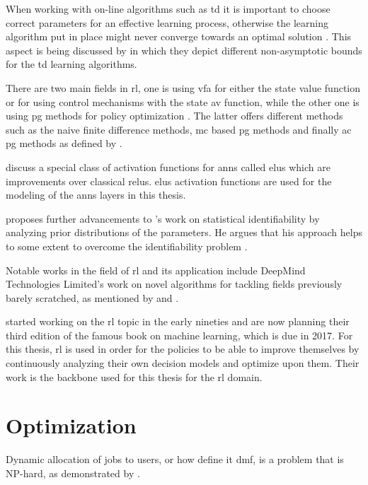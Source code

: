 When working with on-line algorithms such as \gls{td} it is important to choose correct parameters for an effective learning process, otherwise the learning algorithm put in place might never converge towards an optimal solution \citep{Sutton2017}. This aspect is being discussed by \citet{Korda2014} in which they depict different non-asymptotic bounds for the \gls{td} learning algorithms.

There are two main fields in \gls{rl}, one is using \gls{vfa} for either the state value function or for using control mechanisms with the state \gls{av} function, while the other one is using \gls{pg} methods for policy optimization \citep{Sutton2017}. The latter offers different methods such as the naive finite difference methods, \gls{mc} based \gls{pg} methods and finally \gls{ac} \gls{pg} methods as defined by \citet{Silver2014}.

\citet{Clevert2015} discuss a special class of activation functions for \glspl{ann} called \glspl{elu} which are improvements over classical \glspl{relu}. \glspl{elu} activation functions are used for the modeling of the \glspl{ann} layers in this thesis.

\citet{Gershman2016} proposes further advancements to \citet{Zhang2011}'s work on statistical identifiability by analyzing prior distributions of the parameters. He argues that his approach helps to some extent to overcome the identifiability problem \citep{Gershman2016}.

Notable works in the field of \gls{rl} and its application include DeepMind Technologies Limited's work on novel algorithms for tackling fields previously barely scratched, as mentioned by \citet{Mnih2015} and \citet{Silver2016}.

\citet{Sutton2017} started working on the \gls{rl} topic in the early nineties and are now planning their third edition of the famous book on machine learning, which is due in 2017. For this thesis, \gls{rl} is used in order for the policies to be able to improve themselves by continuously analyzing their own decision models and optimize upon them. Their work is the backbone used for this thesis for the \gls{rl} domain.

\section{Optimization}

Dynamic allocation of jobs to users, or how \citet{Zeng2005} define it \ie \gls{dmf}, is a problem that is NP-hard, as demonstrated by \citet{Garey1990}.

